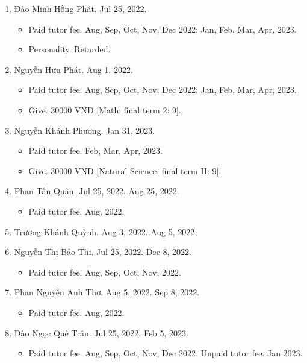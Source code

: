 \documentclass{article}
\begin{document}
\begin{enumerate}
\begin{itemize}
	\end{itemize}
	\item {\sc Đào Minh Hồng Phát.} {\sf[In]} Jul 25, 2022.
	\begin{itemize}
		\item {\sf Paid tutor fee.} Aug, Sep, Oct, Nov, Dec 2022; Jan, Feb, Mar, Apr, 2023.
		\item {\sf Personality.} Retarded.
	\end{itemize}
	\item {\sc Nguyễn Hữu Phát.} {\sf[In]} Aug 1, 2022.
	\begin{itemize}
		\item {\sf Paid tutor fee.} Aug, Sep, Oct, Nov, Dec 2022; Jan, Feb, Mar, Apr, 2023.
		\item {\sf Give.} 30000 VND [Math: final term 2: 9].
	\end{itemize}
	\item {\sc Nguyễn Khánh Phương.}  {\sf[In]} Jan 31, 2023.
	\begin{itemize}
		\item {\sf Paid tutor fee.} Feb, Mar, Apr, 2023.
		\item {\sf Give.} 30000 VND [Natural Science: final term II: 9].
	\end{itemize}
	\item {\sc Phan Tấn Quân.} {\sf[In]} Jul 25, 2022. {\sf[Out]} Aug 25, 2022.
	\begin{itemize}
		\item {\sf Paid tutor fee.} Aug, 2022.
	\end{itemize}
	\item {\sc Trương Khánh Quỳnh.} {\sf[In]} Aug 3, 2022. {\sf[Out]} Aug 5, 2022.
	\item {\sc Nguyễn Thị Bảo Thi.} {\sf[In]} Jul 25, 2022. {\sf[Out]} Dec 8, 2022.
	\begin{itemize}
		\item {\sf Paid tutor fee.} Aug, Sep, Oct, Nov, 2022.
	\end{itemize}
	\item {\sc Phan Nguyễn Anh Thơ.} {\sf[In]} Aug 5, 2022. {\sf[Out]} Sep 8, 2022.
	\begin{itemize}
		\item {\sf Paid tutor fee.} Aug, 2022.
	\end{itemize}
	\item {\sc Đào Ngọc Quế Trân.} {\sf[In]} Jul 25, 2022. {\sf[Out]} Feb 5, 2023.
	\begin{itemize}
		\item {\sf Paid tutor fee.} Aug, Sep, Oct, Nov, Dec 2022. {\sf Unpaid tutor fee.} Jan 2023.

\end{itemize}
\end{enumerate}
\end{document}

